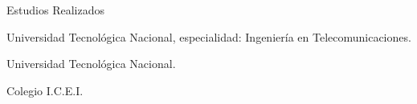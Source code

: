 \begin{rubric}{Estudios Realizados}

 Universidad
Tecnológica Nacional, especialidad: Ingeniería en Te\-le\-co\-mu\-ni\-ca\-cio\-nes.

 Universidad
Tecnológica Nacional.

 Colegio I.C.E.I.  

\end{rubric}
